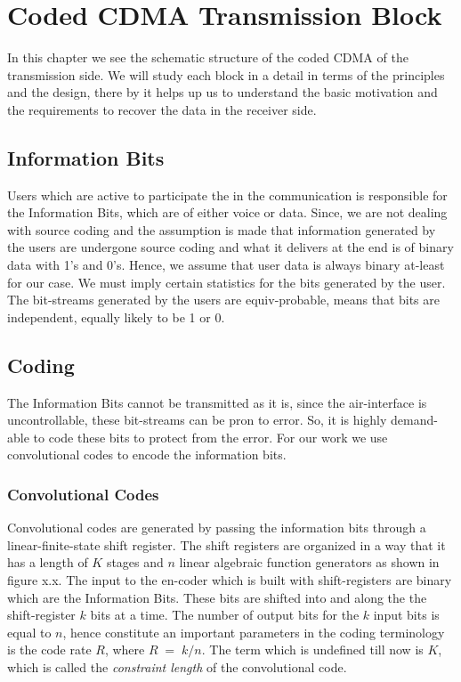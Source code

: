 \chapter{Coded CDMA Transmission Block}

In this chapter we see the schematic structure of the coded CDMA of the transmission side. We will study each block in a detail in terms of the principles and the design, there by it helps up us to understand the basic motivation and the requirements to recover the data in the receiver side. 

\section{Information Bits}

Users which are active to participate the in the communication is responsible for the Information Bits, which are of either voice or data. Since, we are not dealing with source coding and the assumption is made that information generated by the users are undergone source coding and what it delivers at the end is of binary data with 1's and 0's. Hence, we assume that user data is always binary at-least for our case. We must imply certain statistics for the bits generated by the user. The bit-streams generated by the users are equiv-probable, means that bits are independent, equally likely to be 1 or 0.

\section{Coding}

The Information Bits cannot be transmitted as it is, since the air-interface is uncontrollable, these bit-streams can be pron to error. So, it is highly demand-able to code these bits to protect from the error. For our work we use convolutional codes to encode the information bits.


\subsection{Convolutional Codes}

Convolutional codes are generated by passing the information bits through a linear-finite-state shift register. The shift registers are organized in a way that it has a length of $K$ stages and $n$ linear algebraic function generators as shown in figure x.x. The input to the en-coder which is built with shift-registers are binary which are the Information Bits. These bits are shifted into and along the the shift-register $k$ bits at a time. The number of output bits for the $k$ input bits is equal to $n$, hence constitute an important parameters in the coding terminology is the code rate $R$, where $R\;=\;k/n$. The term which is undefined till now is $K$, which is called the \textit{constraint length} of the convolutional code.\\

